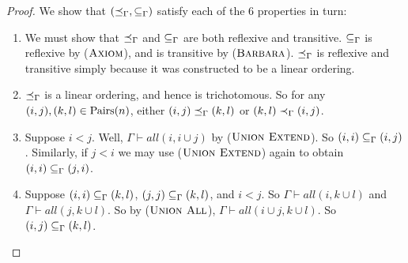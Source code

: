 \documentclass[12pt]{article}
\theoremstyle{definition}
\begin{document}
\begin{proof}


 

We show that $(\preceq_{\Gamma}, \subseteq_{\Gamma})$ satisfy each of the 6 properties in turn:

\begin{enumerate}
    \item We must show that $\preceq_{\Gamma}$ and $\subseteq_{\Gamma}$ are both reflexive and transitive.  $\subseteq_{\Gamma}$ is reflexive by ($\textsc{Axiom}$), and is transitive by ($\textsc{Barbara}$).  $\preceq_{\Gamma}$ is reflexive and transitive simply because it was constructed to be a linear ordering.
    
    
    \item $\preceq_{\Gamma}$ is a linear ordering, and hence is trichotomous.  So for any $(i, j), (k, l) \in \mbox{Pairs}(n)$, either $(i,j) \preceq_{\Gamma} (k,l)$ or $(k,l) \prec_{\Gamma} (i,j)$.
    
    \item Suppose $i < j$.  Well, $\Gamma \vdash all(i, i \cup j)$ by ($\textsc{Union Extend}$).  So $(i, i) \subseteq_{\Gamma} (i, j)$.  Similarly, if $j < i$ we may use ($\textsc{Union Extend}$) again to obtain $(i, i) \subseteq_{\Gamma} (j, i)$.
    
    \item Suppose $(i, i) \subseteq_{\Gamma} (k, l)$, $(j, j) \subseteq_{\Gamma} (k, l)$, and $i < j$.  So $\Gamma \vdash all(i, k \cup l)$ and $\Gamma \vdash all(j, k \cup l)$.  So by ($\textsc{Union All}$), $\Gamma \vdash all(i \cup j, k \cup l)$.  So $(i, j) \subseteq_{\Gamma} (k, l)$.
    

\end{enumerate}
\end{proof}
\end{document}
